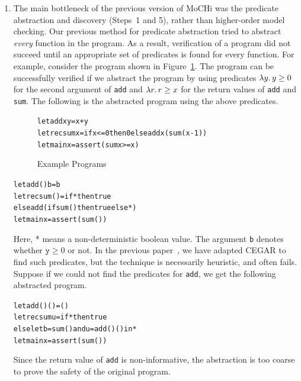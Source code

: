 \begin{enumerate}
\item The main bottleneck of the previous version of MoCHi was the
      predicate abstraction and discovery (Steps~1 and 5), rather than
      higher-order model checking.  Our previous method for predicate
      abstraction tried to abstract \emph{every} function in the
      program. As a result, verification of a program did not succeed
      until an appropriate set of predicates is found for every
      function.  For example, consider the program shown in
      Figure~\ref{fig:sum}.  The program can be successfully verified if
      we abstract the program by using predicates $\lambda{y}.\,{y \geq 0}$
      for the second argument of \texttt{add} and $\lambda{r}.\,{r \geq x}$
      for the return values of \texttt{add} and \texttt{sum}.  The
      following is the abstracted program using the above predicates.
\begin{figure}[t]
\vspace{-5pt}
\begin{alltt}
 let add x y = x + y
 letrec sum x = if x<=0 then 0 else add x (sum(x-1))
 let main x = assert (sum x >= x)
\end{alltt}
\vspace{-5pt}
\caption{Example Programs}
\label{fig:sum}
\end{figure}
\vspace{-5pt}
\begin{alltt}
 let add () b = b
 letrec sum () = if * then true
   else add (if sum () then true else *)
 let main x = assert (sum ())
\end{alltt}
\vspace{-5pt}
      Here, * means a non-deterministic boolean value.  The argument
      \texttt{b} denotes whether $\mathtt{y} \geq 0$ or not.
      In the previous paper~\cite{KobayashiPLDI2011}, we have adapted
      CEGAR to find such predicates, but the technique is necessarily
      heuristic, and often fails.  Suppose if we could not find the
      predicates for \texttt{add}, we get the following abstracted
      program.
\vspace{-5pt}
\begin{alltt}
 let add () () = ()
 letrec sum u = if * then true
   else let b = sum () and u = add () () in *
 let main x = assert (sum ())
\end{alltt}
\vspace{-5pt}
      Since the return value of \texttt{add} is non-informative, the
      abstraction is too coarse to prove the safety of the original program.


\end{enumerate}
